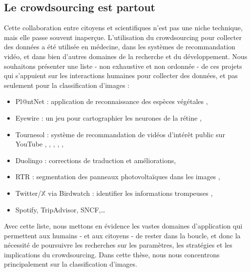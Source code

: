 \subsection{Le crowdsourcing est partout}

Cette collaboration entre citoyens et scientifiques n'est pas une niche technique, mais elle passe souvent inaperçue.
L'utilisation du crowdsourcing pour collecter des données a été utilisée en médecine, dans les systèmes de recommandation vidéo, et dans bien d'autres domaines de la recherche et du développement.
Nous souhaitons présenter une liste - non exhaustive et non ordonnée - de ces projets qui s'appuient sur les interactions humaines pour collecter des données, et pas seulement pour la classification d'images :
\begin{itemize}
    \item Pl@ntNet : application de reconnaissance des espèces végétales \citep{plantet},
    \item Eyewire : un jeu pour cartographier les neurones de la rétine \citep{tinati2017investigation},
    \item Tournesol : système de recommandation de vidéos d'intérêt public sur YouTube \citep{hoang2021tournesol},
    \citep{openai2023gpt4}, \citep{openai2023gpt4}, \citep{openai2023gpt4}, \citep{openai2023gpt4},
    \item Duolingo : corrections de traduction et améliorations,
    \item RTR : segmentation des panneaux photovoltaïques dans les images \citep{kasmi2023crowdsourced},
    \item Twitter/$\mathbb{X}$ via Birdwatch : identifier les informations trompeuses \citep{wojcik2022birdwatch},
    \item Spotify, TripAdvisor, SNCF,\dots
\end{itemize}

Avec cette liste, nous mettons en évidence les vastes domaines d'application qui permettent aux humains - et aux citoyens - de rester dans la boucle, et donc la nécessité de poursuivre les recherches sur les paramètres, les stratégies et les implications du crowdsourcing.
Dans cette thèse, nous nous concentrons principalement sur la classification d'images.

